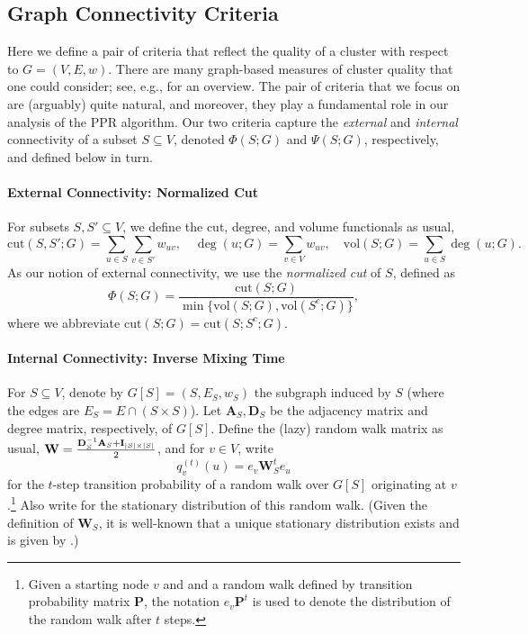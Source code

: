 \documentclass{article}
\DeclarePairedDelimiter\abs{\lvert}{\rvert}
\newcommand{\vol}{\mathrm{vol}}
\newcommand{\cut}{\mathrm{cut}}
\newcommand{\1}{\mathbf{1}}
\newcommand{\Abf}{\mathbf{A}}
\newcommand{\Wbf}{\mathbf{W}}
\newcommand{\Dbf}{\mathbf{D}}
\newcommand{\Ibf}[1]{\mathbf{I}_{#1}}
\theoremstyle{aldenthm}
\theoremstyle{aldenrmrk}
\begin{document}
\subsection{Graph Connectivity Criteria}

Here we define a pair of criteria that reflect the quality of a cluster with
respect to $G=(V,E,w)$.  There are many graph-based measures of cluster quality  
that one could consider; see, e.g., \citep{yang2015,fortunato2010} for 
an overview.  The pair of criteria that we focus on are (arguably) quite
natural, and moreover, they play a fundamental role in our analysis 
of the PPR algorithm.  Our two criteria capture the \emph{external} and
\emph{internal} connectivity of a subset $S \subseteq V$, denoted $\Phi(S; G)$
and $\Psi(S; G)$, respectively, and defined below in turn.  

\paragraph{External Connectivity: Normalized Cut}

For subsets $S,S' \subseteq V$, we define the cut, degree, and volume functionals as usual,
$$
\cut(S, S'; G) = \sum_{u \in S} \sum_{v \in S'} w_{uv}, \quad \deg(u; G) = \sum_{v \in V} w_{uv}, \quad  \vol(S; G) = \sum_{u \in S} \deg(u;G).
$$
As our notion of external connectivity, we use the \emph{normalized cut}  
of $S$, defined as 
\begin{equation}
\label{eqn: norm_cut}
\Phi(S; G) = \frac{\cut(S; G)}{\min\{\vol(S; G), \vol(S^c; G)\}},
\end{equation} 
where we abbreviate $\cut(S; G) = \cut(S; S^c; G)$.

\paragraph{Internal Connectivity: Inverse Mixing Time}

For $S \subseteq V$, denote by $G[S] = (S, E_S, w_S)$ the subgraph induced by 
$S$ (where the edges are $E_S = E \cap (S \times S)$). Let $\Abf_S,\Dbf_S$
be the adjacency matrix and degree matrix, respectively, of $G[S]$.  Define the
(lazy) random walk matrix as usual, $\Wbf = \frac{\Dbf_S^{-1} \Abf_S + \Ibf{\abs{S} \times \abs{S}}}{2}$, and for $v \in V$,
write 
$$
q_{v}^{(t)}(u) = e_v\Wbf_S^t e_u
$$
for the $t$-step transition probability of a random walk over $G[S]$
originating at $v$.\footnote{Given a starting node $v$ and and a random walk
  defined by transition probability matrix $\mathbf{P}$, the notation $e_v
  \mathbf{P}^t$ is used to denote the distribution of the random walk after $t$
  steps.}   Also write 
for the stationary distribution of this random walk.  (Given the definition of 
$\Wbf_S$, it is well-known that a unique stationary distribution exists and is given by
\smash{$\pi(u) = \deg(u; G[S])/\vol(S; G[S])$}.) 
\end{document}

